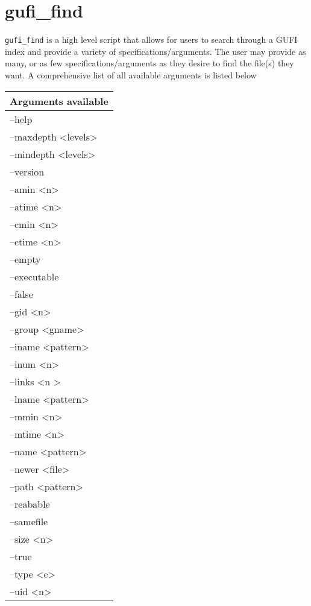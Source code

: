 \section{gufi\_find}
\texttt{gufi\_find} is a high level script that allows for users to search through a GUFI index and provide a variety of specifications/arguments. The user may provide as many, or as few specifications/arguments as they desire to find the file(s) they want. A comprehensive list of all available arguments is listed below

\begin{table} [h]
\centering
\begin{tabular}{l}
Arguments available \\\hline
--help\\
--maxdepth \textless levels\textgreater\\
--mindepth \textless levels\textgreater\\
--version\\
--amin \textless n\textgreater\\
--atime \textless n\textgreater\\
--cmin \textless n\textgreater\\
--ctime \textless n\textgreater\\
--empty\\
--executable\\
--false\\
--gid \textless n\textgreater\\
--group \textless gname\textgreater\\
--iname \textless pattern\textgreater\\
--inum \textless n\textgreater\\
--links \textless n \textgreater\\
--lname \textless pattern\textgreater\\
--mmin \textless n\textgreater\\
--mtime \textless n\textgreater\\
--name \textless pattern\textgreater\\
--newer \textless file\textgreater\\
--path \textless pattern\textgreater\\
--reabable\\
--samefile\\
--size \textless n\textgreater\\
--true\\
--type \textless c\textgreater\\
--uid \textless n\textgreater\\

\end{tabular}
\end{table}
